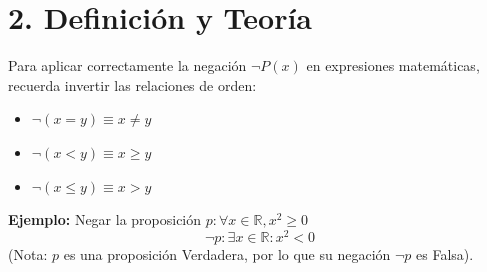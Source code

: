 \documentclass[11pt]{article}
\newenvironment{teoria}{\section*{2. Definición y Teoría}}{}
\newenvironment{ejemplo}[1]{\begin{tcolorbox}[colback=gray!5,colframe=gray!60!black,title=Ejemplo: #1]}{\end{tcolorbox}}
\begin{document}
\begin{teoria}
  \begin{ejemplo}{Aplicación de la Negación Matemática}
    Para aplicar correctamente la negación $\neg P(x)$ en expresiones matemáticas, recuerda invertir las relaciones de orden:
    \begin{itemize}
        \item $\neg(x = y) \equiv x \neq y$
        \item $\neg(x < y) \equiv x \geq y$
        \item $\neg(x \leq y) \equiv x > y$
    \end{itemize}
    \textbf{Ejemplo:} Negar la proposición $p: \forall x \in \mathbb{R}, x^2 \geq 0$
    \[ \neg p : \exists x \in \mathbb{R} : x^2 < 0 \]
    (Nota: $p$ es una proposición Verdadera, por lo que su negación $\neg p$ es Falsa).
  \end{ejemplo}

\end{teoria}
\end{document}
